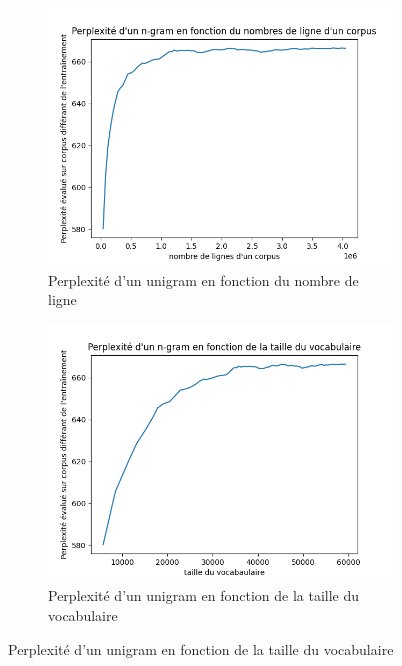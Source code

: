 \documentclass[a4paper]{article}
\begin{document}
\begin{figure}[!ht]
    \centering
    \begin{subfigure}{0.47\textwidth}
      \includegraphics[width=\textwidth]{../results/balzac_result/balzac_1_lines.png}
      \caption{Perplexité d'un unigram en fonction du nombre de ligne}
    \end{subfigure}
    \hfill
    \begin{subfigure}{0.47\textwidth}
      \includegraphics[width=\linewidth]{../results/balzac_result/balzac_1_vocab_size.png}
      \caption{Perplexité d'un unigram en fonction de la taille du vocabulaire}
    \end{subfigure}


\end{figure}
\end{document}

